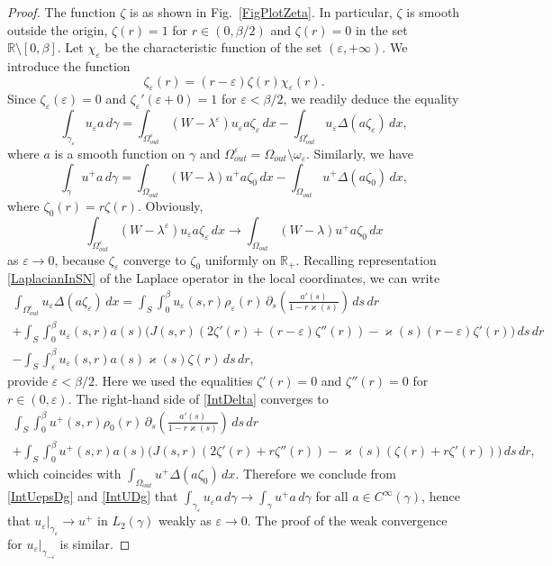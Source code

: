 \documentclass[reqno]{amsart}
\theoremstyle{plain}
\numberwithin{equation}{section}
\renewcommand{\kappa}{\varkappa}
\newcommand{\Real}{\mathbb R}
\newcommand{\eps}{\varepsilon}
\begin{document}
\begin{proof}
The function $\zeta$  is as shown in Fig.~\ref{FigPlotZeta}. In particular, $\zeta$ is smooth outside the origin,  $\zeta(r)=1$ for $r\in (0,\beta/2)$ and $\zeta(r)=0$ in the set $\Real\setminus [0,\beta]$.
Let $\chi_\eps$ be the characteristic function of the set $(\eps,+\infty)$.
We introduce the function
$$
\zeta_\eps(r)=(r-\eps)\zeta(r)\chi_\eps(r).
$$
Since $\zeta_\eps(\eps)=0$ and $\zeta_\eps'(\eps+0)=1$ for $\eps<\beta/2$, we readily deduce  the equality
\begin{equation}\label{IntUepsDg}
  \int_{\gamma_\eps} u_\eps a \,d\gamma=\int_{\Omega_{out}^\eps} (W-\lambda^\eps)u_\eps a\zeta_\eps\,dx-\int_{\Omega_{out}^\eps} u_\eps \Delta (a\zeta_\eps)\,dx,
\end{equation}
where $a$ is a smooth function on $\gamma$ and $\Omega_{out}^\eps=\Omega_{out}\setminus\omega_\eps$.
Similarly, we have
 \begin{equation}\label{IntUDg}
  \int_{\gamma} u^+ a \,d\gamma=\int_{\Omega_{out}} (W-\lambda)u^+ a\zeta_0\,dx-\int_{\Omega_{out}} u^+ \Delta (a\zeta_0)\,dx,
\end{equation}
where $\zeta_0(r)=r\zeta(r)$.
Obviously,
\begin{equation*}
   \int_{\Omega_{out}^\eps} (W-\lambda^\eps)u_\eps a\zeta_\eps\,dx\to
   \int_{\Omega_{out}} (W-\lambda)u^+ a\zeta_0\,dx
\end{equation*}
as $\eps\to 0$, because $\zeta_\eps$ converge to $\zeta_0$ uniformly on $\Real_+$. Recalling representation \eqref{LaplacianInSN} of the Laplace operator in the local coordinates, we can write
\begin{multline}\label{IntDelta}
  \int_{\Omega_{out}^\eps}u_\eps \Delta (a\zeta_\eps)\,dx=
  \int_{S} \int_0^\beta u_\eps(s,r)\rho_\eps(r) \,\partial_s\left(\frac{a'(s)}{1-r \kappa(s)}\right)\,ds\,dr
  \\
  +\int_{S} \int_0^\beta u_\eps(s,r)a(s)\big(J(s,r)(2\zeta'(r)+(r-\eps)\zeta''(r))
  -\kappa(s)(r-\eps)\zeta'(r)\big)\,ds\,dr\\
  -
  \int_{S} \int_\eps^\beta u_\eps(s,r)a(s)\kappa(s)\zeta(r)\,ds\,dr,
\end{multline}
provide $\eps<\beta/2$. Here we used  the equalities $\zeta'(r)=0$ and $\zeta''(r)=0$ for $r\in(0,\eps)$.
The right-hand side of \eqref{IntDelta} converges to
\begin{multline*}
   \int_{S} \int_0^\beta u^+(s,r)\rho_0(r) \,\partial_s\left(\frac{a'(s)}{1-r \kappa(s)}\right)\,ds\,dr
  \\
  +\int_{S} \int_0^\beta u^+(s,r)a(s)\big(J(s,r)(2\zeta'(r)+r\zeta''(r))
  -\kappa(s)(\zeta(r)+r\zeta'(r))\big)\,ds\,dr,
\end{multline*}
which coincides with $\int_{\Omega_{out}}u^+ \Delta (a\zeta_0)\,dx$.
Therefore we conclude from \eqref{IntUepsDg} and \eqref{IntUDg} that
$\int_{\gamma_\eps} u_\eps a \,d\gamma\to \int_{\gamma} u^+ a \,d\gamma$ for all $a\in C^\infty(\gamma)$, hence that  $u_\eps|_{\gamma_{\eps}}\to u^+$ in $L_2(\gamma)$ weakly as $\eps\to 0$. The proof of the weak convergence for   $u_\eps|_{\gamma_{-\eps}}$ is similar.
\end{proof}
\end{document}
